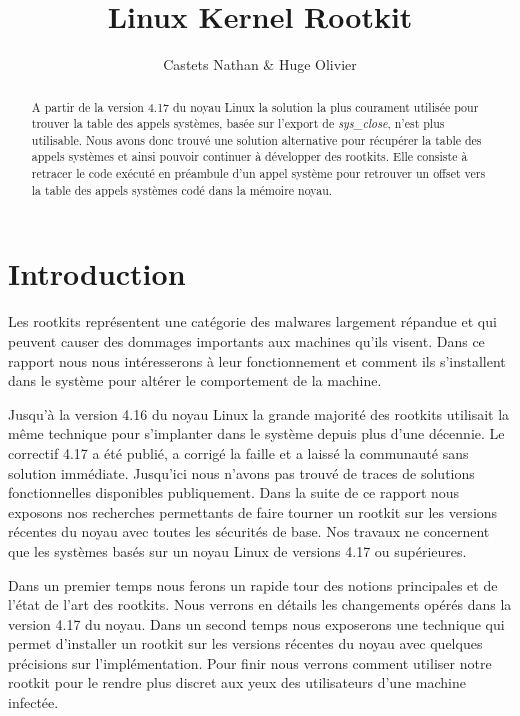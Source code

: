 \documentclass[journal, a4paper]{IEEEtran}
\begin{document}
	\title{Linux Kernel Rootkit}
	\author{Castets Nathan \& Huge Olivier}
	\maketitle

\begin{abstract}
A partir de la version 4.17 du noyau Linux la solution la plus courament utilisée pour trouver la table des appels systèmes, basée sur l'export de \textit{sys\_close},  n'est plus utilisable. Nous avons donc trouvé une solution alternative pour récupérer la table des appels systèmes et ainsi pouvoir continuer à développer des rootkits. Elle consiste à retracer le code exécuté en préambule d'un appel système pour retrouver un offset vers la table des appels systèmes codé dans la mémoire noyau.
\end{abstract}

\section{Introduction}

Les rootkits représentent une catégorie des malwares largement répandue et qui peuvent causer des dommages importants aux machines qu'ils visent. Dans ce rapport nous nous intéresserons à leur fonctionnement et comment ils s'installent dans le système pour altérer le comportement de la machine.

Jusqu'à la version 4.16 du noyau Linux la grande majorité des rootkits utilisait la même technique pour s'implanter dans le système depuis plus d'une décennie. Le correctif 4.17 a été publié, a corrigé la faille et a laissé la communauté sans solution immédiate. Jusqu'ici nous n'avons pas trouvé de traces de solutions fonctionnelles disponibles publiquement. Dans la suite de ce rapport nous exposons nos recherches permettants de faire tourner un rootkit sur les versions récentes du noyau avec toutes les sécurités de base. Nos travaux ne concernent que les systèmes basés sur un noyau Linux de versions 4.17 ou supérieures.

Dans un premier temps nous ferons un rapide tour des notions principales et de l'état de l'art des rootkits. Nous verrons en détails les changements opérés dans la version 4.17 du noyau.
Dans un second temps nous exposerons une technique qui permet d'installer un rootkit sur les versions récentes du noyau avec quelques précisions sur l'implémentation.
Pour finir nous verrons comment utiliser notre rootkit pour le rendre plus discret aux yeux des utilisateurs d'une machine infectée.
\end{document}
